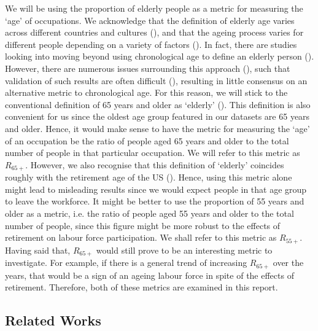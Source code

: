 \documentclass[11pt]{article}
\begin{document}
We will be using the proportion of elderly people as a metric for measuring the `age' of occupations. We acknowledge that the definition of elderly age varies across different countries and cultures (\cite{ageingculture}), and that the ageing process varies for different people depending on a variety of factors (\cite{levine2013modeling,hayflick2007biological}). In fact, there are studies looking into moving beyond using chronological age to define an elderly person (\cite{KotterGrhn2015,SOTOPEREZDECELIS2018e305,klemera2006new}). However, there are numerous issues surrounding this approach (\cite{jylhava2017biological}), such that validation of such results are often difficult (\cite{biologicalagedifficult}), resulting in little consensus on an alternative metric to chronological age. For this reason, we will stick to the conventional definition of 65 years and older as `elderly' (\cite{who2010definition,orimo2006reviewing,oecddata}). This definition is also convenient for us since the oldest age group featured in our datasets are 65 years and older. Hence, it would make sense to have the metric for measuring the `age' of an occupation be the ratio of people aged 65 years and older to the total number of people in that particular occupation. We will refer to this metric as $R_{65+}$. However, we also recognise that this definition of `elderly' coincides roughly with the retirement age of the US (\cite{MunnellAliciaH2013SSRR}). Hence, using this metric alone might lead to misleading results since we would expect people in that age group to leave the workforce. It might be better to use the proportion of 55 years and older as a metric, i.e. the ratio of people aged 55 years and older to the total number of people, since this figure might be more robust to the effects of retirement on labour force participation. We shall refer to this metric as $R_{55+}$. Having said that, $R_{65+}$ would still prove to be an interesting metric to investigate. For example, if there is a general trend of increasing $R_{65+}$ over the years, that would be a sign of an ageing labour force in spite of the effects of retirement. Therefore, both of these metrics are examined in this report.

\subsection*{Related Works}
\end{document}
